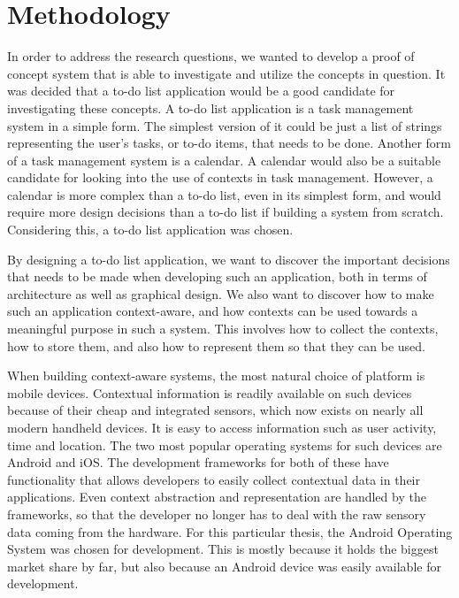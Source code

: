 \chapter{Methodology}
\label{chap:methodology}

In order to address the research questions, we wanted to develop a proof of concept system that is able to investigate and utilize the concepts in question. It was decided that a to-do list application would be a good candidate for investigating these concepts. A to-do list application is a task management system in a simple form. The simplest version of it could be just a list of strings representing the user's tasks, or to-do items, that needs to be done. Another form of a task management system is a calendar. A calendar would also be a suitable candidate for looking into the use of contexts in task management. However, a calendar is more complex than a to-do list, even in its simplest form, and would require more design decisions than a to-do list if building a system from scratch. Considering this, a to-do list application was chosen.

By designing a to-do list application, we want to discover the important decisions that needs to be made when developing such an application, both in terms of architecture as well as graphical design. We also want to discover how to make such an application context-aware, and how contexts can be used towards a meaningful purpose in such a system. This involves how to collect the contexts, how to store them, and also how to represent them so that they can be used.

When building context-aware systems, the most natural choice of platform is mobile devices. Contextual information is readily available on such devices because of their cheap and integrated sensors, which now exists on nearly all modern handheld devices. It is easy to access information such as user activity, time and location. The two most popular operating systems for such devices are Android and iOS. The development frameworks for both of these have functionality that allows developers to easily collect contextual data in their applications. Even context abstraction and representation are handled by the frameworks, so that the developer no longer has to deal with the raw sensory data coming from the hardware. For this particular thesis, the Android Operating System was chosen for development. This is mostly because it holds the biggest market share by far, but also because an Android device was easily available for development.





